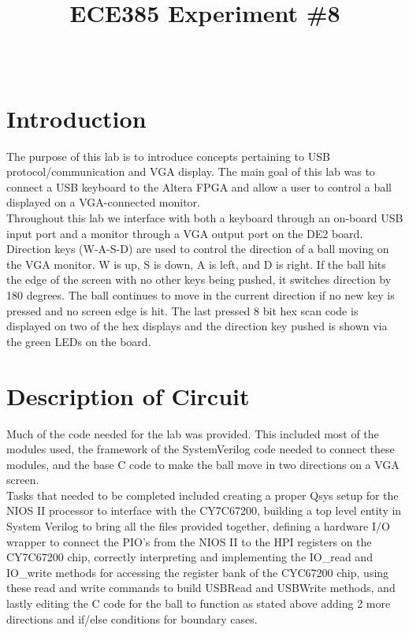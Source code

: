 \documentclass[journal, twocolumn, final,11pt,letterpaper]{IEEEtran}
\title{ECE385 Experiment \#8
	}
\author{
\IEEEauthorblockN{Eric Meyers, Ryan Helsdingen}\\
\IEEEauthorblockA{Section ABG; TAs: Ben Delay, Shuo Liu \\
March 30th, 2016 \\
emeyer7, helsdin2}}
\begin{document}
	
\maketitle
\singlespacing

\section{Introduction}
The purpose of this lab is to introduce concepts pertaining to USB protocol/communication and VGA display. The main goal of this lab was to connect a USB keyboard to the Altera FPGA and allow a user to control a ball displayed on a VGA-connected monitor. \\

Throughout this lab we interface with both a keyboard through an on-board USB input port and a monitor through a VGA output port on the DE2 board.  Direction keys (W-A-S-D) are used to control the direction of a ball moving on the VGA monitor.  W is up, S is down, A is left, and D is right.  If the ball hits the edge of the screen with no other keys being pushed, it switches direction by 180 degrees.  The ball continues to move in the current direction if no new key is pressed and no screen edge is hit.  The last pressed 8 bit hex scan code is displayed on two of the hex displays and the direction key pushed is shown via the green LEDs on the board.

\section{Description of Circuit}
Much of the code needed for the lab was provided.  This included most of the modules used, the framework of the SystemVerilog code needed to connect these modules, and the base C code to make the ball move in two directions on a VGA screen. \\

Tasks that needed to be completed included creating a proper Qsys setup for the NIOS II processor to interface with the CY7C67200, building a top level entity in System Verilog to bring all the files provided together, defining a hardware I/O wrapper to connect the PIO's from the NIOS II to the HPI registers on the CY7C67200 chip, correctly interpreting and implementing the IO\_read and IO\_write methods for accessing the register bank of the CYC67200 chip, using these read and write commands to build USBRead and USBWrite methods, and lastly editing the C code for the ball to function as stated above adding 2 more directions and if/else conditions for boundary cases. 
\end{document}
